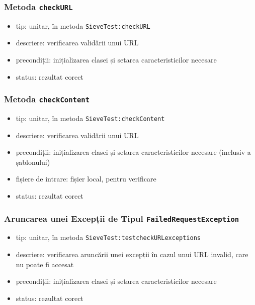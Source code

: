 \documentclass[12pt]{article}
\begin{document}
\subsubsection{Metoda \texttt{checkURL}}

\begin{itemize}
    \item tip: unitar, în metoda \texttt{SieveTest:checkURL}
    \item descriere: verificarea validării unui URL
    \item precondiții: inițializarea clasei și setarea caracteristicilor necesare
    \item status: rezultat corect
\end{itemize}

\subsubsection{Metoda \texttt{checkContent}}

\begin{itemize}
    \item tip: unitar, în metoda \texttt{SieveTest:checkContent}
    \item descriere: verificarea validării unui URL
    \item precondiții: inițializarea clasei și setarea caracteristicilor necesare (inclusiv a șablonului)
    \item fișiere de intrare: fișier local, pentru verificare
    \item status: rezultat corect
\end{itemize}

\subsubsection{Aruncarea unei Excepții de Tipul \texttt{FailedRequestException}}

\begin{itemize}
    \item tip: unitar, în metoda \texttt{SieveTest:testcheckURLexceptions}
    \item descriere: verificarea aruncării unei excepții în cazul unui URL invalid, care nu poate fi accesat
    \item precondiții: inițializarea clasei și setarea caracteristicilor necesare
    \item status: rezultat corect
\end{itemize}
\end{document}
